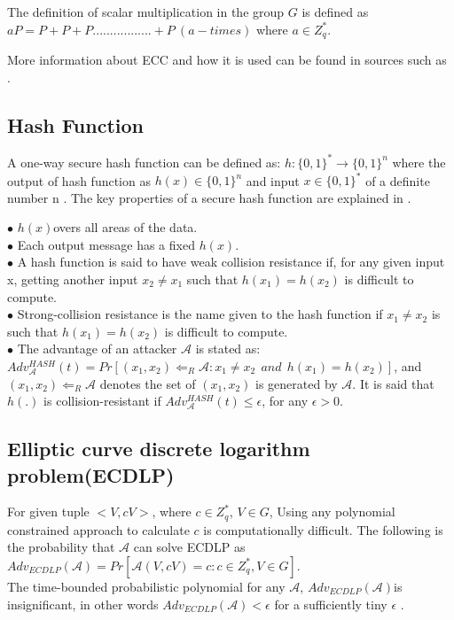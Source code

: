 \documentclass[3p,times,onecolumn]{elsarticle}
\begin{document}
The definition of scalar multiplication in the group $G$ is defined as $aP=P+P+P.................+P~(a-times)$ where $a\in Z_{q}^{*}$.

More information about ECC and how it is used can be found in sources such as \cite{s44, ak01}.

\subsection{\textbf{Hash Function}}
A one-way secure hash function can be defined as:
$h: \{0,1\}^{*}\rightarrow \{0,1\}^{n}$ where the output of hash function as $h(x)\in \{0,1\}^{n}$ and input $x\in \{0,1\}^{*}$ of a definite number n \cite{s43,s45}. 
The key properties of a secure hash function are explained in \cite{s44}.


\textbf{$\bullet $ } $h(x)$overs all areas of the data.\\
\textbf{$\bullet $ }Each output message has a fixed $h(x)$.\\
\textbf{$\bullet $ } A hash function is said to have weak collision resistance if, for any given input x, getting another input $x_{2}\neq x_{1}$ such that $h(x_{1})=h(x_{2})$  is difficult to compute.\\
\textbf{$\bullet $ } Strong-collision resistance is the name given to the hash function if $x_{1}\neq x_{2}$ is such that $h(x_{1})=h(x_{2})$ is difficult to compute.\\
\textbf{$\bullet $ } The advantage of an attacker $\mathcal{A}$ is stated as:\\
$Adv_{\mathcal{A}}^{HASH}(t)=Pr[(x_{1},x_{2})\Leftarrow _{R}\mathcal{A}:x_{1}\neq x_{2} ~~and~~ h(x_{1})=h(x_{2})]$, and $(x_{1},x_{2}) \Leftarrow _{R}\mathcal{A}$ denotes the set of $(x_{1},x_{2})$ is generated by $\mathcal{A}$.  It is said that $h(.)$ is collision-resistant if $Adv_{\mathcal{A}}^{HASH}(t)\leq \epsilon$, for any $\epsilon>0$.

\subsection{\textbf{ Elliptic curve discrete logarithm problem(ECDLP)}}
For given tuple $<V, cV>$, where $c \in Z_{q}^{*}$, $V \in G$, Using any polynomial constrained approach to calculate $c$ is computationally difficult.
The following is the probability that $\mathcal{A}$ can solve ECDLP as $Adv_{ECDLP}(\mathcal{A})=Pr[\mathcal{A}(V,cV)=c: c\in Z_{q}^{*}, V\in G]$.\\
The time-bounded probabilistic polynomial for any $\mathcal{A}$, $Adv_{ECDLP}(\mathcal{A})$is insignificant, in other words $Adv_{ECDLP}(\mathcal{A})<\epsilon$ for a sufficiently tiny $\epsilon$ \cite{b7}.
\end{document}
